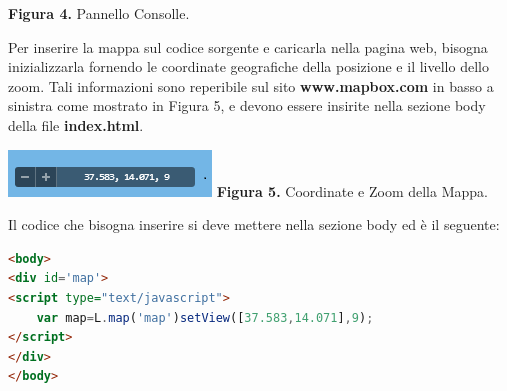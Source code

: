 \documentclass[a4paper,11pt]{article}
\begin{document}
\begin{enumerate}
\begin{enumerate}[label*=\arabic*.]
\begin{center}
				\textbf{Figura 4.} Pannello Consolle.
			\end{center}\newpage			
Per inserire la mappa sul codice sorgente e caricarla nella pagina web, bisogna inizializzarla fornendo le coordinate geografiche della posizione e il livello dello zoom.
Tali informazioni sono reperibile sul sito \textbf{www.mapbox.com} in basso a sinistra come mostrato in Figura 5, e devono essere insirite nella sezione body della file \textbf{index.html}.
			\begin{center}
				\includegraphics[scale=2.3]{coordinate.png}\newline
				\textbf{Figura 5.} Coordinate e Zoom della Mappa.
			\end{center}
	
Il codice che bisogna inserire si deve mettere nella sezione body ed è il seguente:

\begin{lstlisting}[language=HTML, basicstyle=\large]
<body>		
<div id='map'>
<script type="text/javascript">
	var map=L.map('map')setView([37.583,14.071],9);
</script>
</div>
</body>
\end{lstlisting}
				

\end{enumerate}
\end{enumerate}
\end{document}
